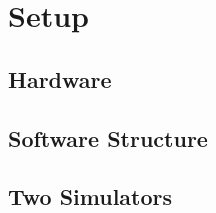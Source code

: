 \section{Setup}
\label{sec:setup}

\subsection{Hardware}

\subsection{Software Structure}

\subsection{Two Simulators}
